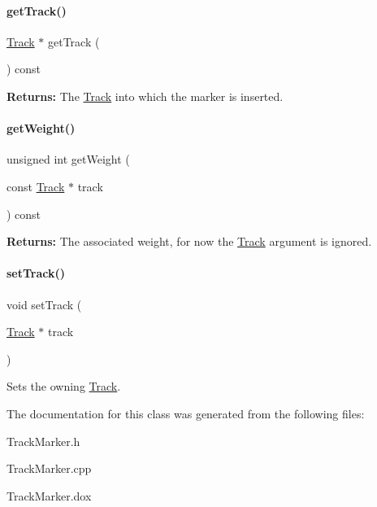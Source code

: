 \paragraph{\texorpdfstring{get\+Track()}{getTrack()}}
{\footnotesize\ttfamily \mbox{\hyperlink{classKite_1_1Track}{Track}} $\ast$ get\+Track (\begin{DoxyParamCaption}{ }\end{DoxyParamCaption}) const\hspace{0.3cm}{\ttfamily [inline]}}

{\bfseries Returns\+:} The \mbox{\hyperlink{classKite_1_1Track}{Track}} into which the marker is inserted. \mbox{\label{classKite_1_1TrackMarker_a26d951691a2c0f564a4ae842ba200ea5}} 
\paragraph{\texorpdfstring{get\+Weight()}{getWeight()}}
{\footnotesize\ttfamily unsigned int get\+Weight (\begin{DoxyParamCaption}\item[{const \mbox{\hyperlink{classKite_1_1Track}{Track}} $\ast$}]{track }\end{DoxyParamCaption}) const\hspace{0.3cm}{\ttfamily [inline]}}

{\bfseries Returns\+:} The associated weight, for now the \mbox{\hyperlink{classKite_1_1Track}{Track}} argument is ignored. \mbox{\label{classKite_1_1TrackMarker_abd3d8093f871d3d1a7f24b053648026c}} 
\paragraph{\texorpdfstring{set\+Track()}{setTrack()}}
{\footnotesize\ttfamily void set\+Track (\begin{DoxyParamCaption}\item[{\mbox{\hyperlink{classKite_1_1Track}{Track}} $\ast$}]{track }\end{DoxyParamCaption})\hspace{0.3cm}{\ttfamily [inline]}}

Sets the owning \mbox{\hyperlink{classKite_1_1Track}{Track}}. 

The documentation for this class was generated from the following files\+:\begin{DoxyCompactItemize}
\item 
Track\+Marker.\+h\item 
Track\+Marker.\+cpp\item 
Track\+Marker.\+dox\end{DoxyCompactItemize}
